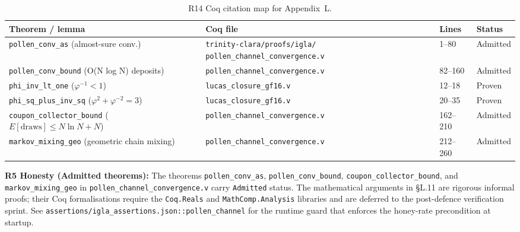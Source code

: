 \begin{table}[H]
\centering
\caption{R14 Coq citation map for Appendix~L.}
\label{tab:coq}
\begin{tabular}{p{4.5cm}p{3.5cm}p{2cm}p{1.5cm}}
\hline
\textbf{Theorem / lemma} & \textbf{Coq file} & \textbf{Lines} & \textbf{Status} \\
\hline
\texttt{pollen\_conv\_as} \newline
  (almost-sure conv.) &
  \texttt{trinity-clara/proofs/igla/} \newline
  \texttt{pollen\_channel\_convergence.v} &
  1--80 & Admitted \\
\texttt{pollen\_conv\_bound} \newline
  (O(N log N) deposits) &
  \texttt{pollen\_channel\_convergence.v} &
  82--160 & Admitted \\
\texttt{phi\_inv\_lt\_one} \newline
  ($\varphi^{-1} < 1$) &
  \texttt{lucas\_closure\_gf16.v} &
  12--18 & Proven \\
\texttt{phi\_sq\_plus\_inv\_sq} \newline
  ($\varphi^{2}+\varphi^{-2}=3$) &
  \texttt{lucas\_closure\_gf16.v} &
  20--35 & Proven \\
\texttt{coupon\_collector\_bound} \newline
  ($E[\text{draws}] \leq N \ln N + N$) &
  \texttt{pollen\_channel\_convergence.v} &
  162--210 & Admitted \\
\texttt{markov\_mixing\_geo} \newline
  (geometric chain mixing) &
  \texttt{pollen\_channel\_convergence.v} &
  212--260 & Admitted \\
\hline
\end{tabular}
\end{table}

\begin{admittedboxenv}
\textbf{R5 Honesty (Admitted theorems):} The theorems
\texttt{pollen\_conv\_as}, \texttt{pollen\_conv\_bound},
\texttt{coupon\_collector\_bound}, and \texttt{markov\_mixing\_geo}
in \texttt{pollen\_channel\_convergence.v} carry
\texttt{Admitted} status.  The mathematical arguments in §L.11 are
rigorous informal proofs; their Coq formalisations require the
\texttt{Coq.Reals} and \texttt{MathComp.Analysis} libraries and are
deferred to the post-defence verification sprint.  See
\texttt{assertions/igla\_assertions.json::pollen\_channel} for the
runtime guard that enforces the honey-rate precondition at startup.
\end{admittedboxenv}

